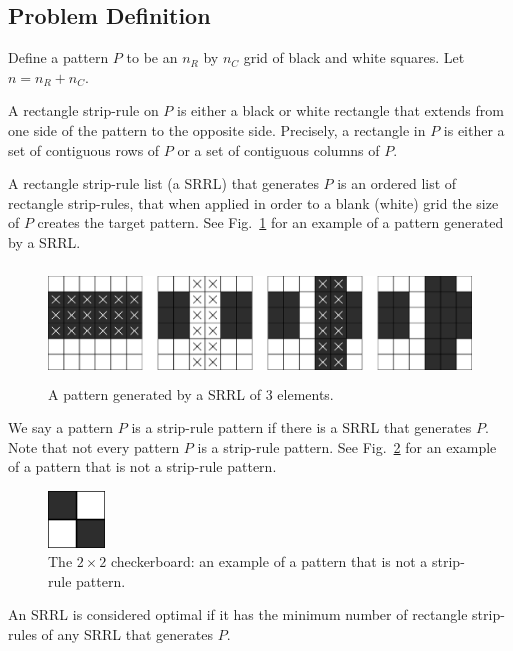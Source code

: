 \subsection{Problem Definition}

Define a pattern $P$ to be an $n_{R} $ by $n_{C}$ grid of black and white squares. Let $n = n_R + n_C$.


A rectangle strip-rule on $P$ is either a black or white rectangle that extends from one side of the pattern to the opposite side.
Precisely, a rectangle in $P$ is either a set of contiguous rows of $P$ or a set of contiguous columns of $P$.

A rectangle strip-rule list (a SRRL) that generates $P$ is an ordered list of rectangle strip-rules, that when applied in order to a blank (white) grid the size of $P$ creates the target pattern. See Fig.~\ref{fig:pattern_generation} for an example of a pattern generated by a SRRL.

\begin{figure}[h]
\centering
\includegraphics[height=3cm]{pattern_generation}
\caption{A pattern generated by a SRRL of 3 elements.}
\label{fig:pattern_generation}
\end{figure}

We say a pattern $P$ is a strip-rule pattern if there is a SRRL that generates $P$. Note that not every pattern $P$ is a strip-rule pattern. See Fig.~\ref{fig:checkerboard} for an example of a pattern that is not a strip-rule pattern.

\begin{figure}[h]
\centering
\includegraphics[width=1.5cm]{checkerboard}
\caption{The $2 \times 2$ checkerboard: an example of a pattern that is not a strip-rule pattern.}
\label{fig:checkerboard}
\end{figure}


An SRRL is considered optimal if it has the minimum number of rectangle strip-rules of any SRRL that generates $P$.
